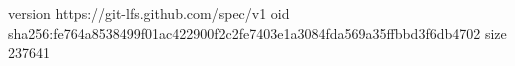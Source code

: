 version https://git-lfs.github.com/spec/v1
oid sha256:fe764a8538499f01ac422900f2c2fe7403e1a3084fda569a35ffbbd3f6db4702
size 237641

